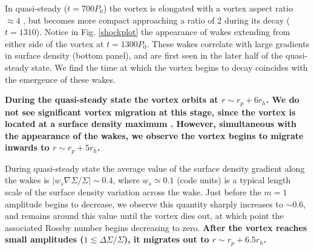 In quasi-steady ($t=700P_0$) the vortex is elongated with a vortex aspect ratio $ \approx 4$
, but becomes more compact approaching a ratio of 2 during its decay ($t=1310$).   
Notice in Fig. \ref{shockplot} the appearance of wakes extending from
either side of the vortex at $t=1300P_0$. These 
wakes correlate with large gradients in surface density (bottom
panel), and are first seen in the later half of the quasi-steady
state. We find the time at which 
the vortex begins to decay coincides with the emergence of these
wakes. %

{\bf During the quasi-steady state the vortex 
  orbits at $r\sim r_p+6r_h$. We do not see significant
  vortex migration at this stage, since the vortex is located at a 
  surface density maximum \citep{paardekooper10}. However,
  simultaneous with the appearance of the wakes, we observe the vortex
  begins to migrate inwards to $r\sim r_p+5r_h$.  
  } 

During quasi-steady state the average value of the surface density gradient
along the wakes is $|w_s\nabla\Sigma/\Sigma| \sim 0.4 $, where 
$w_s\simeq0.1$ (code units) is a typical length scale of 
the surface density variation across the wake.   
Just before the $m=1$ amplitude begins to decrease, we observe this quantity
sharply increases to $ \sim 0.6 $, and remains around this value
until the vortex dies out, at which point the associated Rossby number
begins decreasing to zero. {\bf After the 
  vortex reaches small amplitudes ($1\lesssim\Delta\Sigma/\Sigma$), it 
  migrates out to $r\sim r_p+ 6.5 r_h$. 
}


